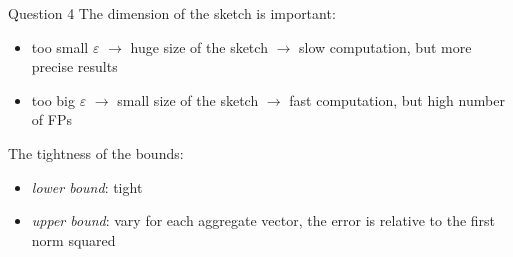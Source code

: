 \begin{block}{Question 4}
The dimension of the sketch is important:
\begin{itemize}
    \item too small $\varepsilon$ $\rightarrow$ huge size of the sketch $\rightarrow$ slow computation, but more precise results
    \item too big $\varepsilon$ $\rightarrow$ small size of the sketch $\rightarrow$ fast computation, but high number of FPs 
\end{itemize}

The tightness of the bounds:
\begin{itemize}
    \item \emph{lower bound}: tight
    \item \emph{upper bound}: vary for each aggregate vector, the error is relative to the first norm squared
\end{itemize}
    
\end{block}
